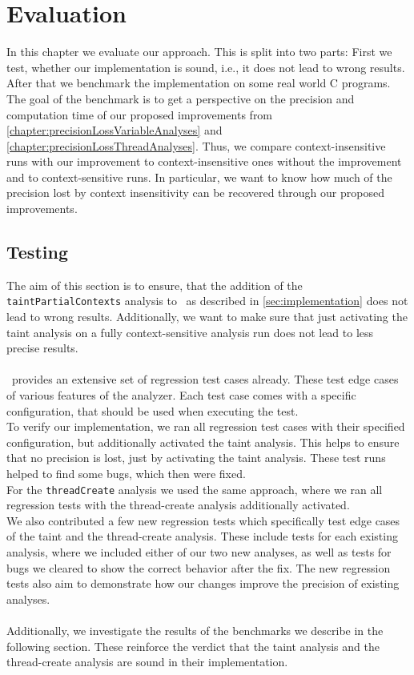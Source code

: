 
\chapter{Evaluation}\label{chapter:evaluation}
  In this chapter we evaluate our approach. This is split into two parts: First we test, whether our implementation is sound, i.e., it does not lead to wrong results. After that we benchmark the implementation on some real world C programs. The goal of the benchmark is to get a perspective on the precision and computation time of our proposed improvements from \autoref{chapter:precisionLossVariableAnalyses} and \autoref{chapter:precisionLossThreadAnalyses}. Thus, we compare context-insensitive runs with our improvement to context-insensitive ones without the improvement and to context-sensitive runs. In particular, we want to know how much of the precision lost by context insensitivity can be recovered through our proposed improvements.

  \section{Testing}
    The aim of this section is to ensure, that the addition of the \texttt{taintPartialContexts} analysis to \gob\ as described in \autoref{sec:implementation} does not lead to wrong results. Additionally, we want to make sure that just activating the taint analysis on a fully context-sensitive analysis run does not lead to less precise results.\\
    \\
    \gob\ provides an extensive set of regression test cases already. These test edge cases of various features of the analyzer. Each test case comes with a specific configuration, that should be used when executing the test.\\
    To verify our implementation, we ran all regression test cases with their specified configuration, but additionally activated the taint analysis. This helps to ensure that no precision is lost, just by activating the taint analysis. These test runs helped to find some bugs, which then were fixed.\\
    For the \texttt{threadCreate} analysis we used the same approach, where we ran all regression tests with the thread-create analysis additionally activated.\\
    We also contributed a few new regression tests which specifically test edge cases of the taint and the thread-create analysis. These include tests for each existing analysis, where we included either of our two new analyses, as well as tests for bugs we cleared to show the correct behavior after the fix. The new regression tests also aim to demonstrate how our changes improve the precision of existing analyses.\\
    \\
    Additionally, we investigate the results of the benchmarks we describe in the following section. These reinforce the verdict that the taint analysis and the thread-create analysis are sound in their implementation.
  
